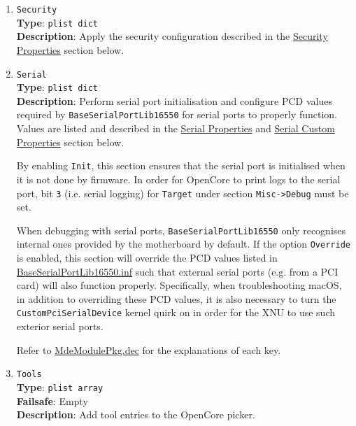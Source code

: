 \documentclass[]{article}
\begin{document}
\begin{enumerate}
  To be filled with \texttt{plist\ dict} values, describing each load entry.
  Refer to the \hyperref[miscentryprops]{Entry Properties} section below for details.

\item
  \texttt{Security}\\
  \textbf{Type}: \texttt{plist\ dict}\\
  \textbf{Description}: Apply the security configuration described in the
  \hyperref[miscsecurityprops]{Security Properties} section below.

\item
  \texttt{Serial}\\
  \textbf{Type}: \texttt{plist\ dict}\\
  \textbf{Description}: Perform serial port initialisation and
  configure PCD values required by \texttt{BaseSerialPortLib16550} for serial ports to properly function.
  Values are listed and described in the \hyperref[miscserialprops]{Serial Properties} and \hyperref[miscserialcustprops]{Serial Custom Properties} section below.

  By enabling \texttt{Init}, this section ensures that the serial port is initialised when it is not done by firmware.
  In order for OpenCore to print logs to the serial port, bit \texttt{3} (i.e. serial logging) for \texttt{Target}
  under section \texttt{Misc->Debug} must be set.

  When debugging with serial ports, \texttt{BaseSerialPortLib16550} only recognises internal ones
  provided by the motherboard by default. If the option \texttt{Override} is enabled, this section will override the PCD values listed in
  \href{https://github.com/acidanthera/audk/blob/master/MdeModulePkg/Library/BaseSerialPortLib16550/BaseSerialPortLib16550.inf}{BaseSerialPortLib16550.inf}
  such that external serial ports (e.g. from a PCI card) will also function properly. Specifically, when troubleshooting macOS,
  in addition to overriding these PCD values, it is also necessary to turn the \texttt{CustomPciSerialDevice} kernel quirk on in order for
  the XNU to use such exterior serial ports.


  Refer to \href{https://github.com/acidanthera/audk/blob/master/MdeModulePkg/MdeModulePkg.dec}{MdeModulePkg.dec} for the explanations of each key.

\item
  \texttt{Tools}\label{misctools}\\
  \textbf{Type}: \texttt{plist\ array}\\
  \textbf{Failsafe}: Empty\\
  \textbf{Description}: Add tool entries to the OpenCore picker.


\end{enumerate}
\end{document}
